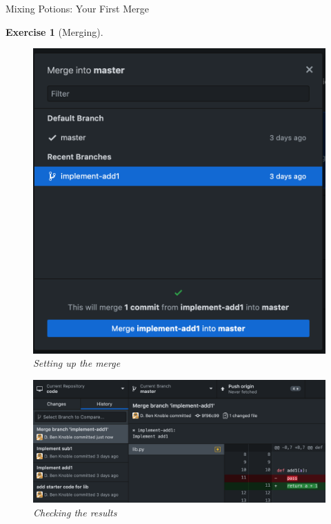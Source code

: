 \documentclass{beamer}
\theoremstyle{example}
\newtheorem{exercise}{Exercise}
\begin{document}
\begin{frame}{Mixing Potions: Your First Merge}
    \begin{exercise}[Merging]
        {\begin{figure}
            \includegraphics[scale=0.3]{img/merge_menu}
            \caption{Setting up the merge}
        \end{figure}}
        {\begin{figure}
            \includegraphics[scale=0.4]{img/merge_commit}
            \caption{Checking the results}
        \end{figure}}
    \end{exercise}
\end{frame}
\end{document}

